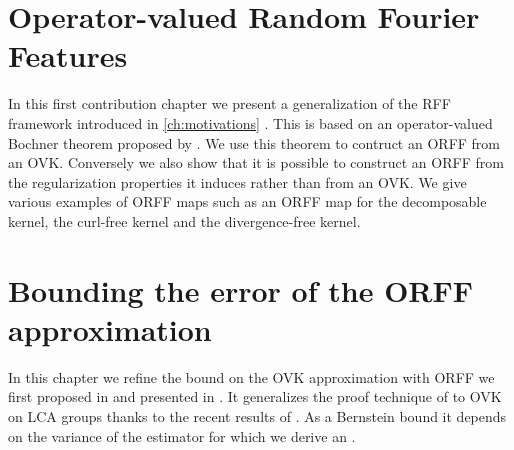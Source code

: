 
\chapter{Operator-valued Random Fourier Features}
\label{ch:operator-valued_random_fourier_features}
\bigskip
\begin{justify}
    In this first contribution chapter we present a generalization of the
    \acs{RFF} framework introduced in \cref{ch:motivations}
    \citep{brault2016random}. This is based on an operator-valued Bochner
    theorem proposed by \citet{Carmeli2010}. We use this theorem to contruct an
    \acf{ORFF} from an \acs{OVK}. Conversely we also show that it is possible
    to construct an \acs{ORFF} from the regularization properties it induces
    rather than from an \acs{OVK}. We give various examples of \acs{ORFF} maps
    such as an \acs{ORFF} map for the decomposable kernel, the curl-free kernel
    and the divergence-free kernel.
\end{justify}
\minitoc


\chapter{Bounding the error of the ORFF approximation} %
\label{ch:concistency_and_generalization}
\bigskip
\begin{justify}
    In this chapter we refine the bound on the \ac{OVK} approximation with
    \ac{ORFF} we first proposed in \cite{brault2016random} and presented in
    \cite{braultborne}. It generalizes the proof technique of
    \citet{Rahimi2007} to \ac{OVK} on \ac{LCA} groups thanks to the recent
    results of \citet{sutherland2015, tropp2015introduction, minsker2011some,
    koltchinskii2013remark}. As a Bernstein bound it depends on the variance of
    the estimator for which we derive an .
\end{justify}
\minitoc


